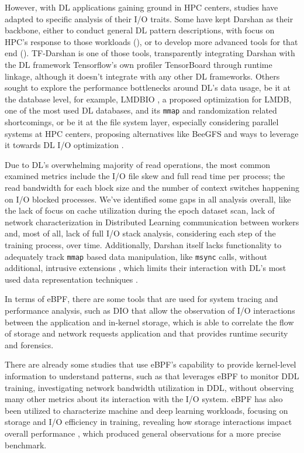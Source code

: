 \documentclass[conference]{IEEEtran}
\begin{document}
However, with DL applications gaining ground in HPC centers, studies have adapted to specific analysis of their I/O traits. Some have kept Darshan as their backbone, either to conduct general DL pattern descriptions, with focus on HPC's response to those workloads (\cite{IOHPCDLBOOK,CharacterizationMLIOLeadHPC, UnderstandingDLIOHPC}), or to develop more advanced tools for that end (\cite{DFTracerAIHPC}). TF-Darshan \cite{tfdarshan} is one of those tools, transparently integrating Darshan with the DL framework Tensorflow's own profiler TensorBoard through runtime linkage, although it doesn't integrate with any other DL frameworks. Others sought to explore the performance bottlenecks around DL's data usage, be it at the database level, for example, LMDBIO \cite{LMDB}, a proposed optimization for LMDB, one of the most used DL databases, and its \texttt{mmap} and randomization related shortcomings, or be it at the file system layer, especially considering parallel systems at HPC centers, proposing alternatives like BeeGFS \cite{beegfs} and ways to leverage it towards DL I/O optimization \cite{beegfsDL}.

Due to DL's overwhelming majority of read operations, the most common examined metrics include the I/O file skew and full read time per process; the read bandwidth for each block size and the number of context switches happening on I/O blocked processes. We've identified some gaps in all analysis overall, like the lack of focus on cache utilization during the epoch dataset scan, lack of network characterization in Distributed Learning communication between workers and, most of all, lack of full I/O stack analysis, considering each step of the training process, over time. Additionally, Darshan itself lacks functionality to adequately track \texttt{mmap} based data manipulation, like \texttt{msync} calls, without additional, intrusive extensions \cite{tfdarshan}, which limits their interaction with DL's most used data representation techniques \cite{LMDB}.

In terms of eBPF, there are some tools that are used for system tracing and performance analysis,
such as DIO \cite{DIO} that allow the observation of I/O interactions between the application and in-kernel storage,
\cite{CAT} which is able to correlate the flow of storage and network requests application and \cite{tracee} that provides runtime security and forensics.

There are already some studies that use eBPF's capability to provide kernel-level information to understand patterns, such as \cite{eBPFDLNetwork} that
leverages eBPF to monitor DDL training, investigating network bandwidth utilization in DDL, without observing many other metrics about its interaction with the I/O system.
eBPF has also been utilized to characterize machine and deep learning workloads, focusing on storage and I/O efficiency in training,
revealing how storage interactions impact overall performance \cite{OanaDL, OanaML}, which produced general observations for a more precise benchmark.
\end{document}
